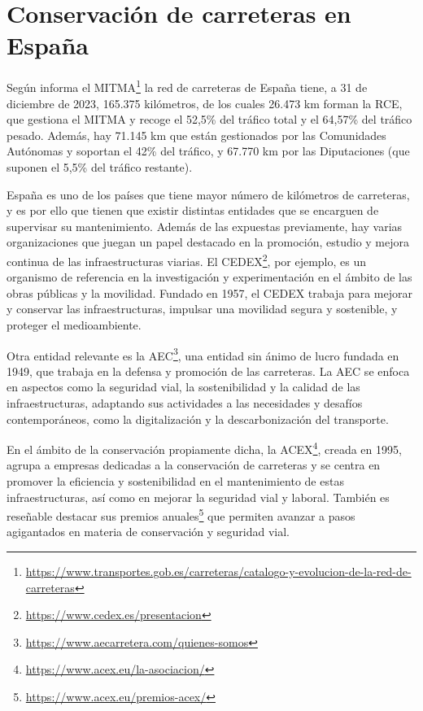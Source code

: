 \section{Conservación de carreteras en España}
\label{sec:conservacioncarreteras}

Según informa el \ac{MITMA}\footnote{\url{https://www.transportes.gob.es/carreteras/catalogo-y-evolucion-de-la-red-de-carreteras}} la red de carreteras de España tiene, a 31 de diciembre de 2023, 165.375 kilómetros, de los cuales 26.473 km forman la \ac{RCE}, que gestiona el \acs{MITMA} y recoge el 52,5\% del tráfico total y el 64,57\% del tráfico pesado. Además, hay 71.145 km que están gestionados por las Comunidades Autónomas y soportan el 42\% del tráfico, y 67.770 km por las Diputaciones (que suponen el 5,5\% del tráfico restante).

España es uno de los países que tiene mayor número de kilómetros de carreteras, y es por ello que tienen que existir distintas entidades que se encarguen de supervisar su mantenimiento. Además de las expuestas previamente, hay varias organizaciones que juegan un papel destacado en la promoción, estudio y mejora continua de las infraestructuras viarias. El \ac{CEDEX}\footnote{\url{https://www.cedex.es/presentacion}}, por ejemplo, es un organismo de referencia en la investigación y experimentación en el ámbito de las obras públicas y la movilidad. Fundado en 1957, el \acs{CEDEX} trabaja para mejorar y conservar las infraestructuras, impulsar una movilidad segura y sostenible, y proteger el medioambiente.

Otra entidad relevante es la \ac{AEC}\footnote{\url{https://www.aecarretera.com/quienes-somos}}, una entidad sin ánimo de lucro fundada en 1949, que trabaja en la defensa y promoción de las carreteras. La \acs{AEC} se enfoca en aspectos como la seguridad vial, la sostenibilidad y la calidad de las infraestructuras, adaptando sus actividades a las necesidades y desafíos contemporáneos, como la digitalización y la descarbonización del transporte.

En el ámbito de la conservación propiamente dicha, la \ac{ACEX}\footnote{\url{https://www.acex.eu/la-asociacion/}}, creada en 1995, agrupa a empresas dedicadas a la conservación de carreteras y se centra en promover la eficiencia y sostenibilidad en el mantenimiento de estas infraestructuras, así como en mejorar la seguridad vial y laboral. También es reseñable destacar sus premios anuales\footnote{\url{https://www.acex.eu/premios-acex/}} que permiten avanzar a pasos agigantados en materia de conservación y seguridad vial.


